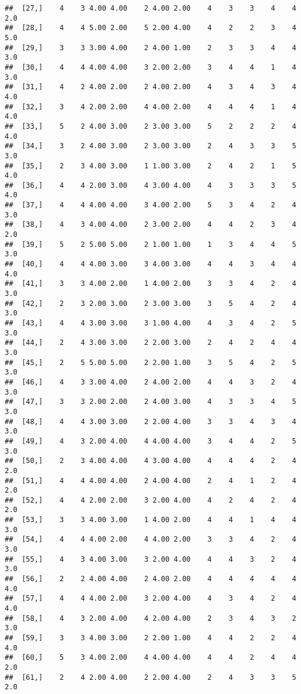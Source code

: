\documentclass[]{article}
\begin{document}
\begin{verbatim}
##  [27,]    4    3 4.00 4.00    2 4.00 2.00    4    3    3    4    4  2.0
##  [28,]    4    4 5.00 2.00    5 2.00 4.00    4    2    2    3    4  5.0
##  [29,]    3    3 3.00 4.00    2 4.00 1.00    2    3    3    4    4  3.0
##  [30,]    4    4 4.00 4.00    3 2.00 2.00    3    4    4    1    4  3.0
##  [31,]    4    2 4.00 2.00    2 4.00 2.00    4    3    4    3    4  4.0
##  [32,]    3    4 2.00 2.00    4 4.00 2.00    4    4    4    1    4  4.0
##  [33,]    5    2 4.00 3.00    2 3.00 3.00    5    2    2    2    4  4.0
##  [34,]    3    2 4.00 3.00    2 3.00 3.00    2    4    3    3    5  3.0
##  [35,]    2    3 4.00 3.00    1 1.00 3.00    2    4    2    1    5  4.0
##  [36,]    4    4 2.00 3.00    4 3.00 4.00    4    3    3    3    5  4.0
##  [37,]    4    4 4.00 4.00    3 4.00 2.00    5    3    4    2    4  3.0
##  [38,]    4    3 4.00 4.00    2 3.00 2.00    4    4    2    3    4  2.0
##  [39,]    5    2 5.00 5.00    2 1.00 1.00    1    3    4    4    5  3.0
##  [40,]    4    4 4.00 3.00    3 4.00 3.00    4    4    3    4    4  4.0
##  [41,]    3    3 4.00 2.00    1 4.00 2.00    3    3    4    2    4  3.0
##  [42,]    2    3 2.00 3.00    2 3.00 3.00    3    5    4    2    4  3.0
##  [43,]    4    4 3.00 3.00    3 1.00 4.00    4    3    4    2    5  3.0
##  [44,]    2    4 3.00 3.00    2 2.00 3.00    2    4    2    4    4  3.0
##  [45,]    2    5 5.00 5.00    2 2.00 1.00    3    5    4    2    5  3.0
##  [46,]    4    3 3.00 4.00    2 4.00 2.00    4    4    3    2    4  3.0
##  [47,]    3    3 2.00 2.00    2 4.00 3.00    4    3    3    4    5  3.0
##  [48,]    4    4 3.00 3.00    2 2.00 4.00    3    3    4    3    4  3.0
##  [49,]    4    3 2.00 4.00    4 4.00 4.00    3    4    4    2    5  3.0
##  [50,]    2    3 4.00 4.00    4 3.00 4.00    4    4    4    2    4  2.0
##  [51,]    4    4 4.00 4.00    2 4.00 4.00    2    4    1    2    4  2.0
##  [52,]    4    4 2.00 2.00    3 2.00 4.00    4    2    4    2    4  2.0
##  [53,]    3    3 4.00 3.00    1 4.00 2.00    4    4    1    4    4  3.0
##  [54,]    4    4 4.00 2.00    4 4.00 2.00    3    3    4    2    4  3.0
##  [55,]    4    3 4.00 3.00    3 2.00 4.00    4    4    3    2    4  3.0
##  [56,]    2    2 4.00 4.00    2 4.00 2.00    4    4    4    4    4  4.0
##  [57,]    4    4 4.00 2.00    3 2.00 4.00    4    3    4    2    4  4.0
##  [58,]    4    3 2.00 4.00    4 2.00 4.00    2    3    4    3    2  3.0
##  [59,]    3    3 4.00 3.00    2 2.00 1.00    4    4    2    2    4  4.0
##  [60,]    5    3 4.00 2.00    4 4.00 4.00    4    4    2    4    4  2.0
##  [61,]    2    4 2.00 4.00    2 2.00 4.00    2    4    3    3    5  2.0

\end{verbatim}
\end{document}
